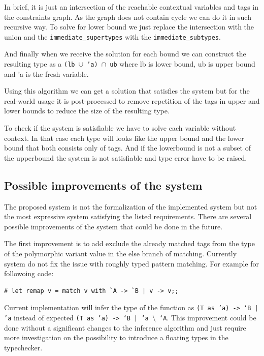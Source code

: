 \documentclass[a4paper,11pt,oneside]{article}
\theoremstyle{definition}
\begin{document}
In brief, it is just an intersection of the reachable contextual variables and tags in the constraints graph. As the graph does not contain cycle we can do it in such recursive way. To solve for lower bound we just replace the intersection with the union and the \texttt{immediate\_supertypes} with the \texttt{immediate\_subtypes}.

And finally when we receive the solution for each bound we can construct the resulting type as a \texttt{(lb $\cup$ 'a) $\cap$ ub} where lb is lower bound, ub is upper bound and 'a is the fresh variable.

Using this algorithm we can get a solution that satisfies the system but for the real-world usage it is post-processed to remove repetition of the tags in upper and lower bounds to reduce the size of the resulting type.

To check if the system is satisfiable we have to solve each variable without context. In that case each type will looks like the upper bound and the lower bound that both consists only of tags. And if the lowerbound is not a subset of the upperbound the system is not satisfiable and type error have to be raised.

\subsection{Possible improvements of the system}

The proposed system is not the formalization of the implemented system but not the most expressive system satisfying the listed requirements. There are several possible improvements of the system that could be done in the future.

The first improvement is to add exclude the already matched tags from the type of the polymorphic variant value in the else branch of matching. Currently system do not fix the issue with roughly typed pattern matching. For example for followoing code:

{\ttfamily\begin{verbatim}
# let remap v = match v with `A -> `B | v -> v;;
\end{verbatim}}

Current implementation will infer the type of the function as \texttt{(T as 'a) -> `B | 'a} instead of expected \texttt{(T as 'a) -> `B | 'a $\setminus$ `A}.
This improvement could be done without a significant changes to the inference algorithm and just require more investigation on the possibility to introduce a floating types in the typechecker.
\end{document}
